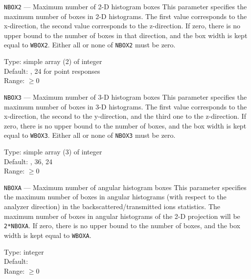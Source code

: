 \begin{keydescription}{\texttt{NBOX2} --- Maximum number of 2-D histogram boxes} 
%
  This parameter specifies the maximum number of boxes in 2-D histograms. The first value 
  corresponds to the x-direction, the second value corresponds to the
  z-direction. If zero, there is no upper bound to the number of boxes in that
  direction, and the box width is kept equal to \texttt{WBOX2}. Either all or
  none of \texttt{NBOX2} must be zero.
  \begin{keytab}
    Type:    \> simple array (2) of integer \\
    Default: , 24 for point responses \\
    Range:   \> $\ge 0$
  \end{keytab}
\end{keydescription}

\begin{keydescription}{\texttt{NBOX3} --- Maximum number of 3-D histogram boxes} 
%
  This parameter specifies the maximum number of boxes in 3-D histograms. The first value 
  corresponds to the x-direction, the second to the y-direction, and the third one to the 
  z-direction. If zero, there is no upper bound to the number of boxes, and the
  box width is kept equal to \texttt{WBOX3}. Either all or none of \texttt{NBOX3} must be zero. 
  \begin{keytab}
    Type:    \> simple array (3) of integer \\
    Default: , 36, 24 \\
    Range:   \> $\ge 0$
  \end{keytab}
\end{keydescription}

\begin{keydescription}{\texttt{NBOXA} --- Maximum number of angular histogram boxes}
%
  This parameter specifies the maximum number of boxes in angular histograms
  (with respect to the analyzer direction) in the backscattered/transmitted ions
  statistics.  The maximum number of boxes in angular histograms of the 2-D
  projection will be \texttt{2*NBOXA}. If zero, there is no upper bound to the
  number of boxes, and the box width is kept equal to \texttt{WBOXA}.
  \begin{keytab}
    Type:    \> integer \\
    Default:  \\
    Range:   \> $\ge 0$
  \end{keytab}
\end{keydescription}

